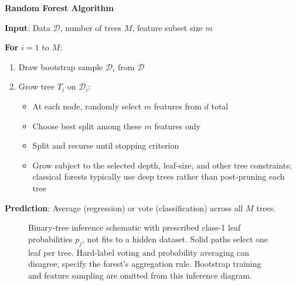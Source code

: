 \documentclass[11pt,twoside]{article}
\numberwithin{equation}{section}
\theoremstyle{plain}
\theoremstyle{definition}
\theoremstyle{remark}
\begin{document}
\begin{algorithmbox}
\textbf{Random Forest Algorithm}

\textbf{Input}: Data $\mathcal{D}$, number of trees $M$, feature subset size $m$

\textbf{For} $i = 1$ to $M$:
\begin{enumerate}
\item Draw bootstrap sample $\mathcal{D}_i$ from $\mathcal{D}$
\item Grow tree $T_i$ on $\mathcal{D}_i$:
\begin{itemize}
\item At each node, randomly select $m$ features from $d$ total
\item Choose best split among these $m$ features only
\item Split and recurse until stopping criterion
\item Grow subject to the selected depth, leaf-size, and other tree constraints; classical forests typically use deep trees rather than post-pruning each tree
\end{itemize}
\end{enumerate}

\textbf{Prediction}: Average (regression) or vote (classification) across all $M$ trees.
\end{algorithmbox}

\begin{figure}[H]
\centering
{}
\caption{Binary-tree inference schematic with prescribed class-1 leaf probabilities $p_j$,
not fits to a hidden dataset. Solid paths select one leaf per tree. Hard-label
voting and probability averaging can disagree; specify the forest's aggregation
rule. Bootstrap training and feature sampling are omitted from this inference diagram.}
\label{fig:randomforest}
\end{figure}
\end{document}
